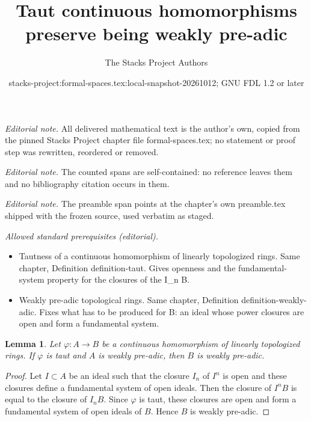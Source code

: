 \documentclass{stacks-project}
\title{Taut continuous homomorphisms preserve being weakly pre-adic}
\author{The Stacks Project Authors}
\date{stacks-project:formal-spaces.tex:local-snapshot-20261012; GNU FDL 1.2 or later}
\theoremstyle{plain}
\newtheorem{lemma}[subsection]{Lemma}
\theoremstyle{definition}
\theoremstyle{remark}
\numberwithin{equation}{subsection}
\begin{document}
\maketitle
\noindent\textit{Editorial note.} All delivered mathematical text is the author's own, copied from the pinned Stacks Project chapter file formal-spaces.tex; no statement or proof step was rewritten, reordered or removed.\par\medskip
\noindent\textit{Editorial note.} The counted spans are self-contained: no reference leaves them and no bibliography citation occurs in them.\par\medskip
\noindent\textit{Editorial note.} The preamble span points at the chapter's own preamble.tex shipped with the frozen source, used verbatim as staged.\par\medskip
\noindent\textit{Allowed standard prerequisites (editorial).}\begin{itemize}
\item Tautness of a continuous homomorphism of linearly topologized rings. Same chapter, Definition definition-taut. Gives openness and the fundamental-system property for the closures of the I\_n B.
\item Weakly pre-adic topological rings. Same chapter, Definition definition-weakly-adic. Fixes what has to be produced for B: an ideal whose power closures are open and form a fundamental system.
\end{itemize}\medskip
\begin{lemma}
\label{lemma-taut-ascent-weakly-adic}
Let $\varphi : A \to B$ be a continuous homomorphism of
linearly topologized rings. If $\varphi$ is taut and $A$
is weakly pre-adic, then $B$ is weakly pre-adic.
\end{lemma}

\begin{proof}
Let $I \subset A$ be an ideal such that the closure $I_n$ of $I^n$
is open and these closures define a fundamental system of open ideals.
Then the closure of $I^nB$ is equal to the closure of $I_nB$.
Since $\varphi$ is taut, these closures are open and form a fundamental
system of open ideals of $B$. Hence $B$ is weakly pre-adic.
\end{proof}
\end{document}
